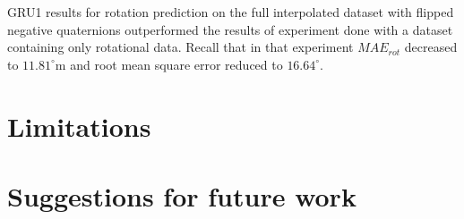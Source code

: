 GRU1 results for rotation prediction on the full interpolated dataset with flipped negative quaternions outperformed the results of experiment done with a dataset containing only rotational data. Recall that in that experiment $MAE_{rot}$ decreased to $11.81^{\circ}$m and root mean square error reduced to  $16.64^{\circ}$.


\section{Limitations}
\label{sec:conclusion:limitations}

\section{Suggestions for future work}
\label{sec:conclusion:future}

